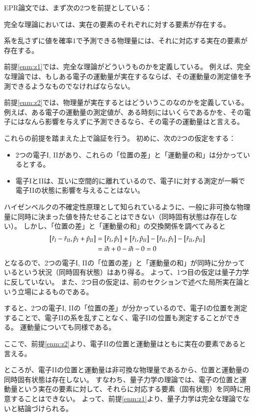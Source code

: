 \documentclass[10pt,b5paper,papersize,dvipdfmx]{jsbook}
\begin{document}
EPR論文では、まず次の2つを前提としている：
\begin{enumerate}[{label=[\arabic*]}]
  \item 完全な理論においては、実在の要素のそれぞれに対する要素が存在する。\label{enm:z1}
  \item 系を乱さずに値を確率1で予測できる物理量には、それに対応する実在の要素が存在する。\label{enm:z2}
\end{enumerate}
\par
前提\ref{enm:z1}では、完全な理論がどういうものかを定義している。
例えば、完全な理論では、もしある電子の運動量が実在するならば、その運動量の測定値を予測できるようなものでなければならない。\par
前提\ref{enm:z2}では、物理量が実在するとはどういうこのなのかを定義している。
例えば、ある電子の運動量の測定値が、ある時刻にはいくらであるかを、その電子にはなんら影響を与えずに予測できるなら、その電子の運動量はと言える。
\par
これらの前提を踏まえた上で論証を行う。
初めに、次の2つの仮定をする：
\begin{itemize}
  \item 2つの電子I, IIがあり、これらの「位置の差」と「運動量の和」は分かっているとする。
  \item 電子IとIIは、互いに空間的に離れているので、電子Iに対する測定が一瞬で電子IIの状態に影響を与えることはない。
\end{itemize}

ハイゼンベルクの不確定性原理として知られているように、一般に非可換な物理量に同時に決まった値を持たせることはできない（同時固有状態は存在しない）。
しかし、「位置の差」と「運動量の和」の交換関係を調べてみると
\begin{align*}
  \comm{\hat r_I - \hat r_{II}}{\hat p_I + \hat p_{II}}
  &= \comm{\hat r_I}{\hat p_I} + \comm{\hat r_I}{\hat p_{II}} - \comm{\hat r_{II}}{\hat p_I} - \comm{\hat r_{II}}{\hat p_{II}} \\
  &= i\hbar + 0 - i\hbar - 0
  = 0
\end{align*}
となるので、2つの電子I, IIの「位置の差」と「運動量の和」が同時に分かっているという状況（同時固有状態）はあり得る。
よって、1つ目の仮定は量子力学に反していない。
また、2つ目の仮定は、前のセクションで述べた局所実在論という立場によるものである。
\par
すると、2つの電子I, IIの「位置の差」が分かっているので、電子Iの位置を測定することで、電子IIの系を乱すことなく、電子IIの位置も測定することができる。
運動量についても同様である。
\par
ここで、前提\ref{enm:z2}より、電子IIの位置と運動量はともに実在の要素であると言える。
\par
ところが、電子IIの位置と運動量は非可換な物理量であるから、位置と運動量の同時固有状態は存在しない。
すなわち、量子力学の理論では、電子の位置と運動量という実在の要素に対して、それらに対応する要素（固有状態）を同時に用意することはできない。
よって、前提\ref{enm:z1}より、量子力学は完全な理論でないと結論づけられる。
\end{document}
